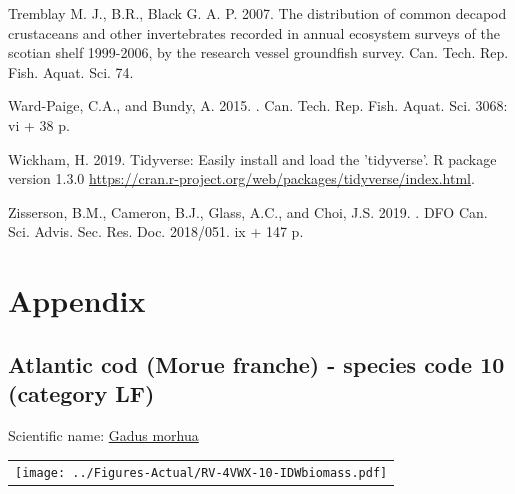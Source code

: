 \documentclass[12pt]{article}\usepackage[]{graphicx}\usepackage[]{color}
\begin{document}
\begin{CSLReferences}{1}{0}
\leavevmode\hypertarget{ref-Tremblayetal:2007}{}%
Tremblay M. J., B.R., Black G. A. P. 2007. The distribution of common decapod crustaceans and other invertebrates recorded in annual ecosystem surveys of the scotian shelf 1999-2006, by the research vessel groundfish survey. Can. Tech. Rep. Fish. Aquat. Sci. 74.

\leavevmode\hypertarget{ref-WardPaige2016}{}%
Ward-Paige, C.A., and Bundy, A. 2015. . Can. Tech. Rep. Fish. Aquat. Sci. 3068: vi + 38 p.

\leavevmode\hypertarget{ref-R:Tidyverse}{}%
Wickham, H. 2019. Tidyverse: Easily install and load the 'tidyverse'. R package version 1.3.0 \url{https://cran.r-project.org/web/packages/tidyverse/index.html}.

\leavevmode\hypertarget{ref-Zisserson2019}{}%
Zisserson, B.M., Cameron, B.J., Glass, A.C., and Choi, J.S. 2019. . DFO Can. Sci. Advis. Sec. Res. Doc. 2018/051. ix + 147 p.

\end{CSLReferences}
\pagebreak

\hypertarget{appendix}{%
\section{Appendix}\label{appendix}}

\pagebreak 

\renewcommand\thefigure{\thesubsection\Alph{figure}}

\setcounter{figure}{0}

\hypertarget{sec:10}{%
\subsection{Atlantic cod (Morue franche) - species code 10 (category LF)}\label{sec:10}}

  


Scientific name: \href{http://www.marinespecies.org/aphia.php?p=taxdetails\&id=126436}{Gadus morhua} \newline
\begin{minipage}{1.0\textwidth}
 \begin{tabular}{c}
\texttt{[image: ../Figures-Actual/RV-4VWX-10-IDWbiomass.pdf]} \\ 
\end{tabular} 
\end{minipage}
\newline
\end{document}
